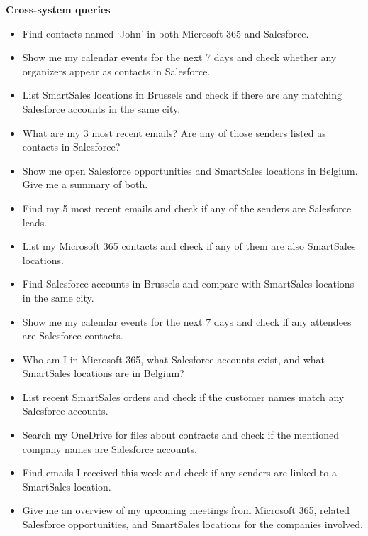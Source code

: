 \begin{appendices}
\textbf{Cross-system queries}
\begin{itemize}[noitemsep]
  \item Find contacts named `John' in both Microsoft 365 and Salesforce.
  \item Show me my calendar events for the next 7 days and check whether any organizers appear as contacts in Salesforce.
  \item List SmartSales locations in Brussels and check if there are any matching Salesforce accounts in the same city.
  \item What are my 3 most recent emails? Are any of those senders listed as contacts in Salesforce?
  \item Show me open Salesforce opportunities and SmartSales locations in Belgium. Give me a summary of both.
  \item Find my 5 most recent emails and check if any of the senders are Salesforce leads.
  \item List my Microsoft 365 contacts and check if any of them are also SmartSales locations.
  \item Find Salesforce accounts in Brussels and compare with SmartSales locations in the same city.
  \item Show me my calendar events for the next 7 days and check if any attendees are Salesforce contacts.
  \item Who am I in Microsoft 365, what Salesforce accounts exist, and what SmartSales locations are in Belgium?
  \item List recent SmartSales orders and check if the customer names match any Salesforce accounts.
  \item Search my OneDrive for files about contracts and check if the mentioned company names are Salesforce accounts.
  \item Find emails I received this week and check if any senders are linked to a SmartSales location.
  \item Give me an overview of my upcoming meetings from Microsoft 365, related Salesforce opportunities, and SmartSales locations for the companies involved.
\end{itemize}

\end{appendices}







